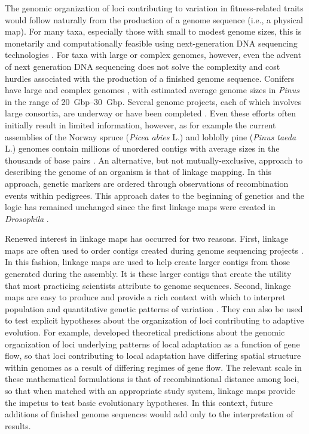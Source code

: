 \documentclass[smallextended]{svjour3}
\begin{document}
The genomic organization of loci contributing to variation in
fitness-related traits would follow naturally from the production of a genome
sequence (i.e., a physical map). For many taxa, especially those with small to
modest genome sizes, this is monetarily and computationally feasible using
next-generation DNA sequencing technologies \citep{Koboldt:2013}. For taxa with
large or complex genomes, however, even the advent of next generation DNA
sequencing does not solve the complexity and cost hurdles associated with the
production of a finished genome sequence. Conifers have large and complex
genomes \citep{Murray:1998, Ahuja:2005}, with estimated average genome sizes in
\textit{Pinus} in the range of \SIrange{20}{30}{Gbp}. Several genome projects,
each of which involves large consortia, are underway or have been completed
\citep{Mackay:2012}. Even these efforts often initially result in limited
information, however, as for example the current assemblies of the Norway spruce
(\textit{Picea abies} L.) and loblolly pine (\textit{Pinus taeda} L.) genomes
contain millions of unordered contigs with average sizes in the thousands of
base pairs \citep{Nystedt:2013, Neale:2014}. An alternative, but not
mutually-exclusive, approach to describing the genome of an organism is that of
linkage mapping. In this approach, genetic markers are ordered through
observations of recombination events within pedigrees. This approach dates to
the beginning of genetics and the logic has remained unchanged since
the first linkage maps were created in \textit{Drosophila}
\citep{Sturtevant:1913}.

Renewed interest in linkage maps has occurred for two reasons. First, linkage
maps are often used to order contigs created during genome sequencing projects
\citep{Mackay:2012, Martinez-Garcia:2013}. In this fashion, linkage maps are
used to help create larger contigs from those generated during the assembly. It
is these larger contigs that create the utility that most practicing scientists
attribute to genome sequences. Second, linkage maps are easy to
produce and provide a rich context with which to interpret population and
quantitative genetic patterns of variation \citep[e.g.,][]{Eckert:2010a,
  Eckert:2010b, Eckert:2013a, Yeaman:2013}. They can also be used to test
explicit hypotheses about the organization of loci contributing to adaptive
evolution. For example, \citet{Yeaman:2011} developed theoretical predictions
about the genomic organization of loci underlying patterns of local adaptation
as a function of gene flow, so that loci contributing to local adaptation have
differing spatial structure within genomes as a result of differing regimes of
gene flow. The relevant scale \citep[\textit{sensu}][]{Houle:2011} in these
mathematical formulations is that of recombinational distance among loci, so
that when matched with an appropriate study system, linkage maps provide the
impetus to test basic evolutionary hypotheses. In this context, future additions
of finished genome sequences would add only to the interpretation of results.
\end{document}
